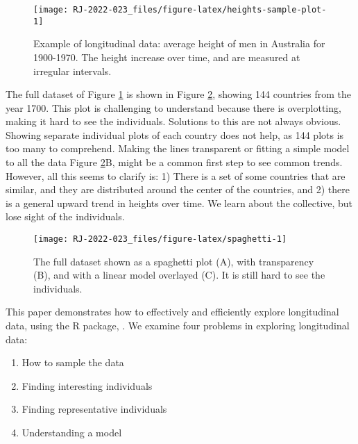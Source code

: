 \begin{figure}

{\centering \texttt{[image: RJ-2022-023\_files/figure-latex/heights-sample-plot-1]} 

}

\caption{Example of longitudinal data: average height of men in Australia for 1900-1970. The height increase over time, and are measured at irregular intervals.}\label{fig:heights-sample-plot}
\end{figure}

The full dataset of Figure \ref{fig:heights-sample-plot} is shown in Figure \ref{fig:spaghetti}, showing 144 countries from the year 1700. This plot is challenging to understand because there is overplotting, making it hard to see the individuals. Solutions to this are not always obvious. Showing separate individual plots of each country does not help, as 144 plots is too many to comprehend. Making the lines transparent or fitting a simple model to all the data Figure \ref{fig:spaghetti}B, might be a common first step to see common trends. However, all this seems to clarify is: 1) There is a set of some countries that are similar, and they are distributed around the center of the countries, and 2) there is a general upward trend in heights over time. We learn about the collective, but lose sight of the individuals.

\begin{figure}

{\centering \texttt{[image: RJ-2022-023\_files/figure-latex/spaghetti-1]} 

}

\caption{The full dataset shown as a spaghetti plot (A), with transparency (B), and with a linear model overlayed (C). It is still hard to see the individuals.}\label{fig:spaghetti}
\end{figure}

This paper demonstrates how to effectively and efficiently explore longitudinal data, using the R package, . We examine four problems in exploring longitudinal data:

\begin{enumerate}
\def\labelenumi{\arabic{enumi}.}
\tightlist
\item
  How to sample the data
\item
  Finding interesting individuals
\item
  Finding representative individuals
\item
  Understanding a model
\end{enumerate}


